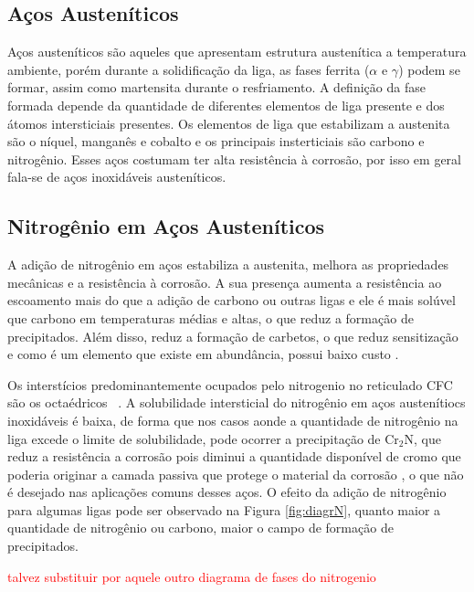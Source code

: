 \documentclass[]{politex}
\newcommand\myworries[1]{\textcolor{red}{#1}}
\begin{document}
\subsection{Aços Austeníticos}
	Aços austeníticos são aqueles que apresentam estrutura austenítica a temperatura ambiente, porém durante a solidificação da liga, as fases ferrita ($\alpha$ e $\gamma$) podem se formar, assim como martensita durante o resfriamento. A definição da fase formada depende da quantidade de diferentes elementos de liga presente e dos átomos intersticiais presentes. Os elementos de liga que estabilizam a austenita são o níquel, manganês e cobalto e os principais insterticiais são carbono e nitrogênio.
	Esses aços costumam ter alta resistência à corrosão, por isso em geral fala-se de aços inoxidáveis austeníticos.

\subsection{Nitrogênio em Aços Austeníticos}
	A adição de nitrogênio em aços estabiliza a austenita, melhora as propriedades mecânicas e a resistência à corrosão. A sua presença aumenta a resistência ao escoamento mais do que a adição de carbono ou outras ligas e ele é mais solúvel que carbono em temperaturas médias e altas, o que reduz a formação de precipitados. Além disso, reduz a formação de carbetos, o que reduz sensitização e como é um elemento que existe em abundância, possui baixo custo \cite{reed1989nitrogen}.\par
	Os interstícios predominantemente ocupados pelo nitrogenio no reticulado CFC são os octaédricos ~\cite{christiansen2006controlled}. A solubilidade intersticial do nitrogênio em aços austenítiocs inoxidáveis é baixa, de forma que nos casos aonde a quantidade de nitrogênio na liga excede o limite de solubilidade, pode ocorrer a precipitação de Cr$_{2}$N, que reduz a resistência a corrosão pois diminui a quantidade disponível de cromo que poderia originar a camada passiva que protege o material da corrosão \cite{somers2018expanded}, o que não é desejado nas aplicações comuns desses aços. O efeito da adição de nitrogênio para algumas ligas pode ser observado na Figura \ref{fig:diagrN}, quanto maior a quantidade de nitrogênio ou carbono, maior o campo de formação de precipitados.\par
\myworries{talvez substituir por aquele outro diagrama de fases do nitrogenio}
\end{document}

